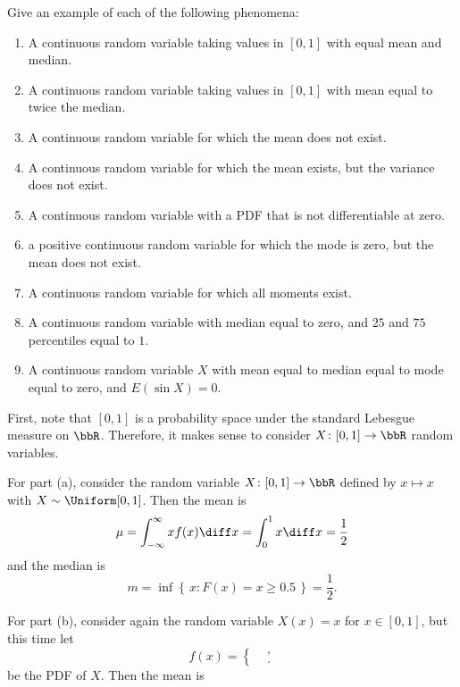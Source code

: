 \begin{problem}[Handout 13, \# 16]
  Give an example of each of the following phenomena:
  \begin{enumerate}[label=(\alph*),noitemsep]
  \item A continuous random variable taking values in \([0,1]\) with equal
    mean and median.
  \item A continuous random variable taking values in \([0,1]\) with mean
    equal to twice the median.
  \item A continuous random variable for which the mean does not exist.
  \item A continuous random variable for which the mean exists, but the
    variance does not exist.
  \item A continuous random variable with a PDF that is not differentiable
    at zero.
  \item a positive continuous random variable for which the mode is zero,
    but the mean does not exist.
  \item A continuous random variable for which all moments exist.
  \item A continuous random variable with median equal to zero, and
    \(25\) and \(75\) percentiles equal to \(1\).
  \item A continuous random variable \(X\) with mean equal to median equal
    to mode equal to zero, and \(E(\sin X)=0\).
  \end{enumerate}
\end{problem}
\begin{solution}
  First, note that \([0,1]\) is a probability space under the standard
  Lebesgue measure on \(\bbR\). Therefore, it makes sense to consider
  \(X\colon[0,1]\to\bbR\) random variables.

  For part (a), consider the random variable \(X\colon[0,1]\to\bbR\)
  defined by \(x\mapsto x\) with \(X\sim\Uniform[0,1]\). Then the mean is
  \[
    \mu=\int_{-\infty}^\infty xf(x)\diff x=\int_0^1 x\diff x=\frac{1}{2}
  \]
  and the median is
  \[
    m=\inf\left\{\,x:F(x)=x\geq 0.5\,\right\}=\frac{1}{2}.
  \]

  For part (b), consider again the random variable \(X(x)=x\) for
  \(x\in[0,1]\), but this time let
  \[
    f(x)=
    \begin{cases}
      &\text{},\\
      &\text{}.
    \end{cases}
  \]
  be the PDF of \(X\). Then the mean is
\end{solution}
\newpage

